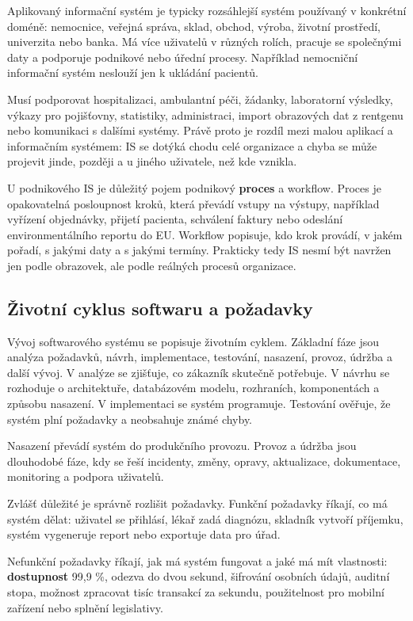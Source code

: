 Aplikovaný informační systém je typicky rozsáhlejší systém používaný v konkrétní doméně: nemocnice, veřejná správa, sklad, obchod, výroba, životní prostředí, univerzita nebo banka. Má více uživatelů v různých rolích, pracuje se společnými daty a podporuje podnikové nebo úřední procesy. Například nemocniční informační systém neslouží jen k ukládání pacientů.

Musí podporovat hospitalizaci, ambulantní péči, žádanky, laboratorní výsledky, výkazy pro pojišťovny, statistiky, administraci, import obrazových dat z rentgenu nebo komunikaci s dalšími systémy. Právě proto je rozdíl mezi malou aplikací a informačním systémem: IS se dotýká chodu celé organizace a chyba se může projevit jinde, později a u jiného uživatele, než kde vznikla.

U podnikového IS je důležitý pojem podnikový \textbf{proces} a workflow. Proces je opakovatelná posloupnost kroků, která převádí vstupy na výstupy, například vyřízení objednávky, přijetí pacienta, schválení faktury nebo odeslání environmentálního reportu do EU. Workflow popisuje, kdo krok provádí, v jakém pořadí, s jakými daty a s jakými termíny. Prakticky tedy IS nesmí být navržen jen podle obrazovek, ale podle reálných procesů organizace.

\subsection*{Životní cyklus softwaru a požadavky}

Vývoj softwarového systému se popisuje životním cyklem. Základní fáze jsou analýza požadavků, návrh, implementace, testování, nasazení, provoz, údržba a další vývoj. V analýze se zjišťuje, co zákazník skutečně potřebuje. V návrhu se rozhoduje o architektuře, databázovém modelu, rozhraních, komponentách a způsobu nasazení. V implementaci se systém programuje. Testování ověřuje, že systém plní požadavky a neobsahuje známé chyby.

Nasazení převádí systém do produkčního provozu. Provoz a údržba jsou dlouhodobé fáze, kdy se řeší incidenty, změny, opravy, aktualizace, dokumentace, monitoring a podpora uživatelů.

Zvlášť důležité je správně rozlišit požadavky. Funkční požadavky říkají, co má systém dělat: uživatel se přihlásí, lékař zadá diagnózu, skladník vytvoří příjemku, systém vygeneruje report nebo exportuje data pro úřad.

Nefunkční požadavky říkají, jak má systém fungovat a jaké má mít vlastnosti: \textbf{dostupnost} 99,9 \%, odezva do dvou sekund, šifrování osobních údajů, auditní stopa, možnost zpracovat tisíc transakcí za sekundu, použitelnost pro mobilní zařízení nebo splnění legislativy.

